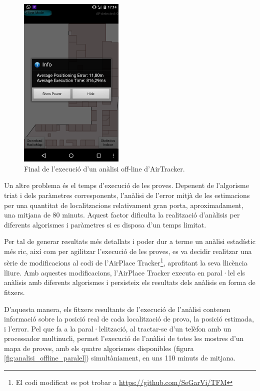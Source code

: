 \begin{figure}[ht]
\begin{center}
\includegraphics[width=5cm]{imatges/analisi_offline_defecte.png}
\caption{Final de l'execució d'un anàlisi off-line d'AirTracker.}
\label{fig:analisi_offline_defecte}
\end{center}
\end{figure}

Un altre problema és el temps d'execució de les proves. Depenent de l'algorisme triat i dels paràmetres corresponents, l'anàlisi de l'error mitjà de les estimacions per una quantitat de localitzacions relativament gran porta, aproximadament, una mitjana de 80 minuts. Aquest factor dificulta la realització d'anàlisis per diferents algorismes i paràmetres si es disposa d'un temps limitat.

Per tal de generar resultats més detallats i poder dur a terme un anàlisi estadístic més ric, així com per agilitzar l'execució de les proves, es va decidir realitzar una sèrie de modificacions al codi de l'AirPlace Tracker\footnote{El codi modificat es pot trobar a \url{https://github.com/SeGarVi/TFM}}, aprofitant la seva llicència lliure. Amb aquestes modificacions, l'AirPlace Tracker executa en paral·lel els anàlisis amb diferents algorismes i persisteix els resultats dels anàlisis en forma de fitxers.

D'aquesta manera, els fitxers resultants de l'execució de l'anàlisi contenen informació sobre la posició real de cada localització de prova, la posició estimada, i l'error. Pel que fa a la paral·lelització, al tractar-se d'un telèfon amb un processador multinucli, permet l'execució de l'anàlisi de totes les mostres d'un mapa de proves, amb els quatre algorismes disponibles (figura \ref{fig:analisi_offline_paralel}) simultàniament, en uns 110 minuts de mitjana.


